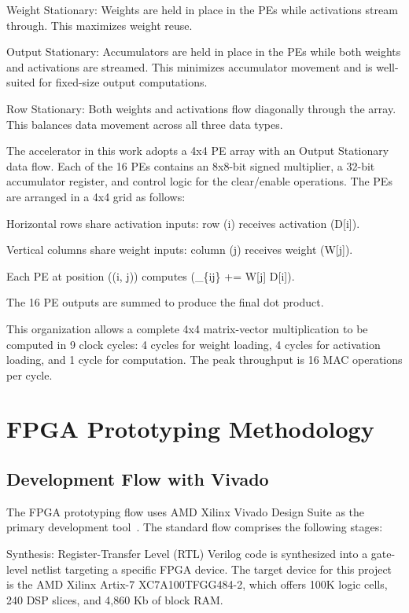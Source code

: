 Weight Stationary: Weights are held in place in the PEs while activations stream through. This maximizes weight reuse.


Output Stationary: Accumulators are held in place in the PEs while both weights and activations are streamed. This minimizes accumulator movement and is well-suited for fixed-size output computations.


Row Stationary: Both weights and activations flow diagonally through the array. This balances data movement across all three data types.


The accelerator in this work adopts a 4x4 PE array with an Output Stationary data flow. Each of the 16 PEs contains an 8x8-bit signed multiplier, a 32-bit accumulator register, and control logic for the clear/enable operations. The PEs are arranged in a 4x4 grid as follows:


Horizontal rows share activation inputs: row (i) receives activation (D[i]).


Vertical columns share weight inputs: column (j) receives weight (W[j]).


Each PE at position ((i, j)) computes (\_\{ij\} += W[j] D[i]).


The 16 PE outputs are summed to produce the final dot product.


This organization allows a complete 4x4 matrix-vector multiplication to be computed in 9 clock cycles: 4 cycles for weight loading, 4 cycles for activation loading, and 1 cycle for computation. The peak throughput is 16 MAC operations per cycle.


\section{FPGA Prototyping Methodology}\label{sec:2_4}

\subsection{Development Flow with Vivado}

The FPGA prototyping flow uses AMD Xilinx Vivado Design Suite as the primary development tool~\cite{XILINX_UG901,XILINX_UG904}. The standard flow comprises the following stages:


Synthesis: Register-Transfer Level (RTL) Verilog code is synthesized into a gate-level netlist targeting a specific FPGA device. The target device for this project is the AMD Xilinx Artix-7 XC7A100TFGG484-2, which offers 100K logic cells, 240 DSP slices, and 4,860 Kb of block RAM.


